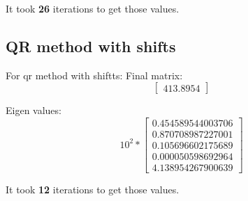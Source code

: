 It took \textbf{26} iterations to get those values.

\subsection{QR method with shifts}
For qr method with shiftts:
Final matrix:
\[
\begin{bmatrix}
413.8954
\end{bmatrix}
\]

Eigen values:
\[
10^{2} *
\begin{bmatrix}
  0.454589544003706 \\
  0.870708987227001 \\
  0.105696602175689 \\
  0.000050598692964 \\
  4.138954267900639
\end{bmatrix}
\]

It took \textbf{12} iterations to get those values.

\newpage
